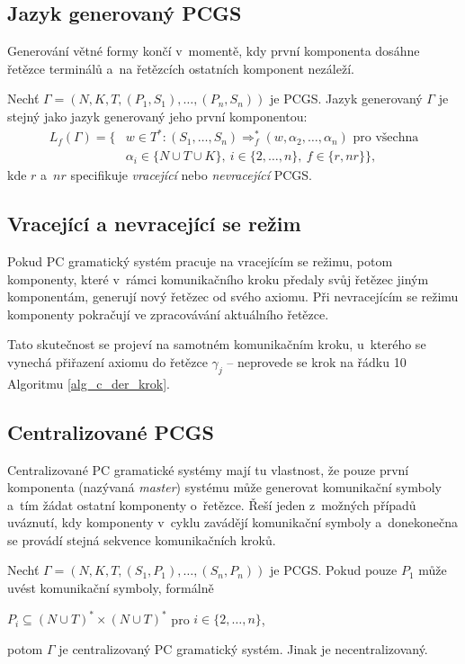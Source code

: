\subsection*{Jazyk generovaný PCGS}\label{def_gener_jazyk_pcgs}
Generování větné formy končí v~momentě, kdy první komponenta dosáhne řetězce terminálů a~na řetězcích ostatních komponent nezáleží.
\begin{definition}
    Nechť $\Gamma = (N, K, T, (P_1, S_1), \ldots, (P_n, S_n))$ je PCGS.
    Jazyk generovaný $\Gamma$ je stejný jako jazyk generovaný jeho první komponentou:
    \begin{align*}
        L_f(\Gamma) = \{&w \in T^*: (S_1, \ldots, S_n) \Rightarrow^*_f (w, \alpha_2, \ldots, \alpha_n)\text{ pro všechna} \\ 
        & \alpha_i \in \{N \cup T \cup K\},\ i \in \{2, \ldots, n\},\ f \in \{r, nr\}\},
    \end{align*}
    kde $r$ a~$nr$ specifikuje \emph{vracející} nebo \emph{nevracející} PCGS.
\end{definition}

\subsection*{Vracející a nevracející se režim}
Pokud PC gramatický systém pracuje na vracejícím se režimu, potom komponenty, které v~rámci komunikačního kroku předaly svůj řetězec jiným komponentám, generují nový řetězec od svého axiomu.
Při nevracejícím se režimu komponenty pokračují ve zpracovávání aktuálního řetězce.

Tato skutečnost se projeví na samotném komunikačním kroku, u~kterého se vynechá přiřazení axiomu do řetězce $\gamma_j$ -- neprovede se krok na řádku 10 Algoritmu \ref{alg_c_der_krok}.

\subsection*{Centralizované PCGS}
Centralizované PC gramatické systémy mají tu vlastnost, že pouze první komponenta (nazývaná \emph{master}) systému může generovat komunikační symboly a~tím žádat ostatní komponenty o~řetězce.
Řeší jeden z~možných případů uváznutí, kdy komponenty v~cyklu zavádějí komunikační symboly a~donekonečna se provádí stejná sekvence komunikačních kroků. 

\begin{definition}
    Nechť $\Gamma = (N, K, T, (S_1, P_1), \ldots, (S_n, P_n))$ je PCGS.
    Pokud pouze $P_1$ může uvést komunikační symboly, formálně
    \begin{center}
        $P_i \subseteq (N \cup T)^* \times (N \cup T)^*$ pro $i \in \{2, \ldots, n\}$,
    \end{center}
    potom $\Gamma$ je centralizovaný PC gramatický systém.
    Jinak je necentralizovaný.
\end{definition}

